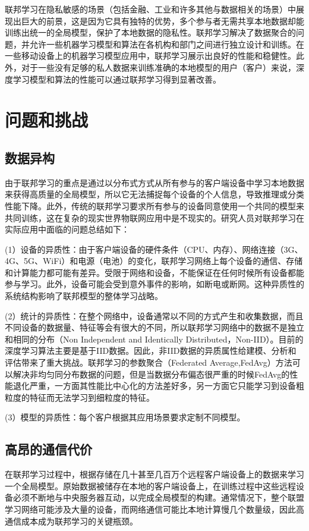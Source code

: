 联邦学习在隐私敏感的场景（包括金融、工业和许多其他与数据相关的场景）中展现出巨大的前景，这是因为它具有独特的优势，多个参与者无需共享本地数据却能训练出统一的全局模型，保护了本地数据的隐私性。联邦学习解决了数据聚合的问题，并允许一些机器学习模型和算法在各机构和部门之间进行独立设计和训练。在一些移动设备上的机器学习模型应用中，联邦学习展示出良好的性能和稳健性。此外，对于一些没有足够的私人数据来训练准确的本地模型的用户（客户）来说，深度学习模型和算法的性能可以通过联邦学习得到显著改善。

\section {问题和挑战}
\subsection{数据异构}
由于联邦学习的重点是通过以分布式方式从所有参与的客户端设备中学习本地数据来获得高质量的全局模型，所以它无法捕捉每个设备的个人信息，导致推理或分类性能下降。此外，传统的联邦学习要求所有参与的设备同意使用一个共同的模型来共同训练，这在复杂的现实世界物联网应用中是不现实的。研究人员对联邦学习在实际应用中面临的问题总结如下：

(1）设备的异质性：由于客户端设备的硬件条件（CPU、内存）、网络连接（3G、4G、5G、WiFi）和电源（电池）的变化，联邦学习网络上每个设备的通信、存储和计算能力都可能有差异。受限于网络和设备，不能保证在任何时候所有设备都能参与学习。此外，设备可能会受到意外事件的影响，如断电或断网。这种异质性的系统结构影响了联邦模型的整体学习战略。

(2）统计的异质性：在整个网络中，设备通常以不同的方式产生和收集数据，而且不同设备的数据量、特征等会有很大的不同，所以联邦学习网络中的数据不是独立和相同的分布（Non Independent and Identically Distributed，Non-IID）。目前的深度学习算法主要是基于IID数据。因此，非IID数据的异质属性给建模、分析和评估带来了重大挑战。联邦学习的参数聚合（Federated Average,FedAvg）方法可以解决非均匀同分布数据的问题，但是当数据分布偏态很严重的时候FedAvg的性能退化严重，一方面其性能比中心化的方法差好多，另一方面它只能学习到设备粗粒度的特征而无法学习到细粒度的特征。

(3）模型的异质性：每个客户根据其应用场景要求定制不同模型。

\subsection{高昂的通信代价}
在联邦学习过程中，根据存储在几十甚至几百万个远程客户端设备上的数据来学习一个全局模型。原始数据被储存在本地的客户端设备上，在训练过程中这些远程设备必须不断地与中央服务器互动，以完成全局模型的构建。通常情况下，整个联盟学习网络可能涉及大量的设备，而网络通信可能比本地计算慢几个数量级，因此高通信成本成为联邦学习的关键瓶颈。

